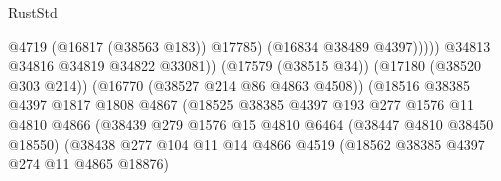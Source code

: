 \begin{lexlean}{RustStd}
\begin{coremodule}
                                                              @4719
                                                              (@16817 (@38563 @183))
                                                              @17785)
                                                            (@16834 @38489 @4397)))))
                                                    @34813
                                                    @34816
                                                    @34819
                                                    @34822
                                                    @33081))
                                                (@17579 (@38515 @34))
                                                (@17180 (@38520 @303 @214))
                                                (@16770 (@38527 @214 @86 @4863 @4508))
                                                (@18516
                                                  @38385
                                                  @4397
                                                  @1817
                                                  @1808
                                                  @4867
                                                  (@18525
                                                    @38385
                                                    @4397
                                                    @193
                                                    @277
                                                    @1576
                                                    @11
                                                    @4810
                                                    @4866
                                                    (@38439
                                                      @279
                                                      @1576
                                                      @15
                                                      @4810
                                                      @6464
                                                      (@38447 @4810 @38450 @18550)
                                                      (@38438
                                                        @277
                                                        @104
                                                        @11
                                                        @14
                                                        @4866
                                                        @4519
                                                        (@18562 @38385 @4397 @274 @11 @4865 @18876)

\end{coremodule}
\end{lexlean}
